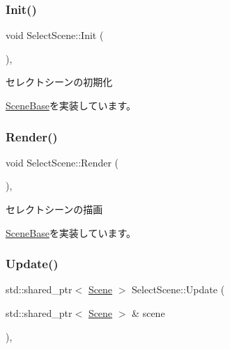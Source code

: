 \mbox{\label{class_select_scene_a20b3a902b5521d7494ed353731b3065d}} 
\subsubsection{\texorpdfstring{Init()}{Init()}}
{\footnotesize\ttfamily void Select\+Scene\+::\+Init (\begin{DoxyParamCaption}{ }\end{DoxyParamCaption})\hspace{0.3cm}{\ttfamily [final]}, {\ttfamily [virtual]}}



セレクトシーンの初期化 



\mbox{\hyperlink{class_scene_base_a24d7db43c819924dc8b07b436f6d3148}{Scene\+Base}}を実装しています。

\mbox{\label{class_select_scene_a85445536ad84d5232c724ecb7d48b8aa}} 
\subsubsection{\texorpdfstring{Render()}{Render()}}
{\footnotesize\ttfamily void Select\+Scene\+::\+Render (\begin{DoxyParamCaption}{ }\end{DoxyParamCaption})\hspace{0.3cm}{\ttfamily [final]}, {\ttfamily [virtual]}}



セレクトシーンの描画 



\mbox{\hyperlink{class_scene_base_ad981674ce731ea267f398e889bbb9dc3}{Scene\+Base}}を実装しています。

\mbox{\label{class_select_scene_a0cef696ddf74155e061cc5f9f2e06419}} 
\subsubsection{\texorpdfstring{Update()}{Update()}}
{\footnotesize\ttfamily std\+::shared\+\_\+ptr$<$ \mbox{\hyperlink{class_scene}{Scene}} $>$ Select\+Scene\+::\+Update (\begin{DoxyParamCaption}\item[{std\+::shared\+\_\+ptr$<$ \mbox{\hyperlink{class_scene}{Scene}} $>$ \&}]{scene }\end{DoxyParamCaption})\hspace{0.3cm}{\ttfamily [final]}, {\ttfamily [virtual]}}



